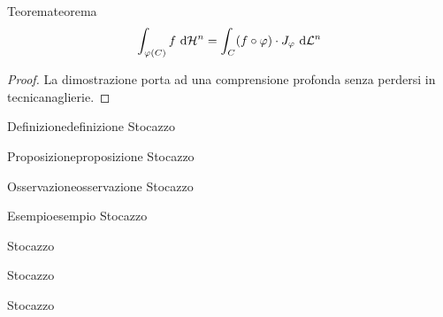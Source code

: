 \documentclass{article}
\begin{document}
\begin{theorem}{Teorema}{teorema}
    \[\int_{\varphi(C)} f \text{ d} \mathcal{H}^n = \int_{C} (f\circ \varphi) \cdot J_\varphi \text{ d} \mathcal{L}^n\]
\end{theorem}

\begin{proof}
    La dimostrazione porta ad una comprensione profonda senza perdersi in tecnicanaglierie.
\end{proof}

\begin{definition}{Definizione}{definizione}
    Stocazzo
\end{definition}

\begin{proposition}{Proposizione}{proposizione}
    Stocazzo
\end{proposition}

\begin{remark}{Osservazione}{osservazione}
    Stocazzo
\end{remark}

\begin{example}{Esempio}{esempio}
    Stocazzo
\end{example}

\begin{notation}
    Stocazzo
\end{notation}

\begin{lemma}{}{}
    Stocazzo
\end{lemma}

\begin{corollary}{}{}
    Stocazzo
\end{corollary}
\end{document}
